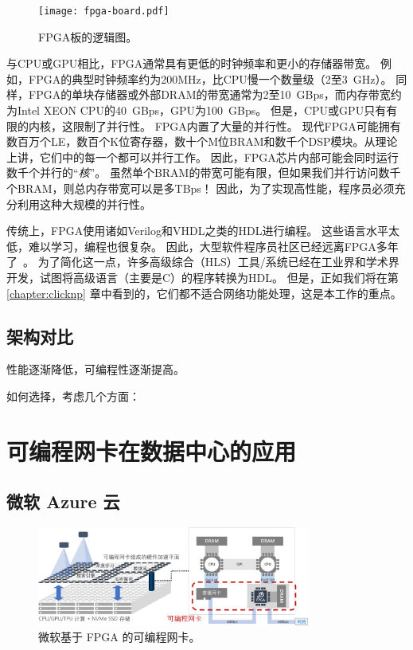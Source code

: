 \begin{figure}[t]
	\centering
	\texttt{[image: fpga-board.pdf]}
	
	\caption{FPGA板的逻辑图。}
	\label{clicknp:fig:fpga}
	
\end{figure}


与CPU或GPU相比，FPGA通常具有更低的时钟频率和更小的存储器带宽。
例如，FPGA的典型时钟频率约为200MHz，比CPU慢一个数量级（2至3~GHz）。
同样，FPGA的单块存储器或外部DRAM的带宽通常为2至10~GBps，而内存带宽约为Intel XEON CPU的40~GBps，GPU为100~GBps。
但是，CPU或GPU只有有限的内核，这限制了并行性。 FPGA内置了大量的并行性。
现代FPGA可能拥有数百万个LE，数百个K位寄存器，数十个M位BRAM和数千个DSP模块。从理论上讲，它们中的每一个都可以并行工作。
因此，FPGA芯片内部可能会同时运行数千个并行的``\textit {核}''。
虽然单个BRAM的带宽可能有限，但如果我们并行访问数千个BRAM，则总内存带宽可以是多TBps！
因此，为了实现高性能，程序员必须充分利用这种大规模的并行性。

传统上，FPGA使用诸如Verilog和VHDL之类的HDL进行编程。
这些语言水平太低，难以学习，编程也很复杂。
因此，大型软件程序员社区已经远离FPGA多年了~\cite {bacon2013fpga}。
为了简化这一点，许多高级综合（HLS）工具/系统已经在工业界和学术界开发，试图将高级语言（主要是C）的程序转换为HDL。
但是，正如我们将在第 \ref{chapter:clicknp} 章中看到的，它们都不适合网络功能处理，这是本工作的重点。


\subsection{架构对比}
\label{smartnic-comparison}

性能逐渐降低，可编程性逐渐提高。

如何选择，考虑几个方面：

\section{可编程网卡在数据中心的应用}

\subsection{微软 Azure 云}

\begin{figure}[htbp]
	\centering
	\includegraphics[width=0.8\textwidth]{figures/azure_fpga.pdf}
	\caption{微软基于 FPGA 的可编程网卡。}
	\label{background:fig:azure_fpga}
\end{figure}



